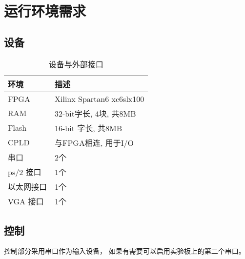 \section{运行环境需求}
    \subsection{设备}

        \begin{table}[!hbp]
        \centering
        \caption{设备与外部接口}
        \begin{tabular}{|l|l|}
        \hline
        环境 & 描述 \\
        \hline
        FPGA & Xilinx Spartan6 xc6slx100 \\
        \hline
        RAM & 32-bit字长, 4块, 共8MB \\
        \hline
        Flash & 16-bit 字长, 共8MB \\
        \hline
        CPLD & 与FPGA相连, 用于I/O \\
        \hline
        串口 & 2个 \\
        \hline
        ps/2 接口 & 1个 \\
        \hline
        以太网接口 & 1个 \\
        \hline
        VGA 接口 & 1个 \\
        \hline
        \end{tabular}
        \end{table}

    \subsection{控制}
        控制部分采用串口作为输入设备，%
        如果有需要可以启用实验板上的第二个串口。%
